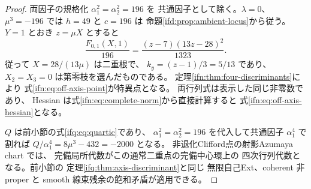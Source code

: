 \begin{proof}
両因子の規格化 $\alpha_1^2=\alpha_2^2=196$ を
共通因子として除く。$\lambda=0$、
$\mu^3=-196$ では $h=49$ と $c=196$ は
命題\ref{ifd:prop:ambient-locus}から従う。
$Y=1$ とおき $z=\mu X$ とすると
\[
 \frac{F_{0,1}(X,1)}{196}
 =\frac{(z-7)(13z-28)^2}{1323}.
\]
従って $X=28/(13\mu)$ は二重根で、
$k_y=(z-1)/3=5/13$ であり、$X_2=X_3=0$ は第零枝を選んだものである。
定理\ref{ifn:thm:four-discriminants}により
式\eqref{ifn:eq:off-axis-point}が特異点となる。
両行列式は表示した同じ非零数であり、
Hessian は式\eqref{ifn:eq:complete-norm}から直接計算すると
式\eqref{ifn:eq:off-axis-hessian}となる。

$Q$ は前小節の式\eqref{ifq:eq:quartic}であり、
$\alpha_1^2=\alpha_2^2=196$ を代入して共通因子
$\alpha_1^4$ で割れば
$Q/\alpha_1^4=8\mu^3-432=-2000$ となる。
非退化Clifford点の射影Azumaya chart では、
完備局所代数がこの通常二重点の完備中心環上の
四次行列代数となる。前小節の
定理\ref{ifq:thm:axis-discriminant}と同じ
無限自己Ext、coherent 非 proper と
smooth 線束残余の飽和矛盾が適用できる。
\end{proof}




